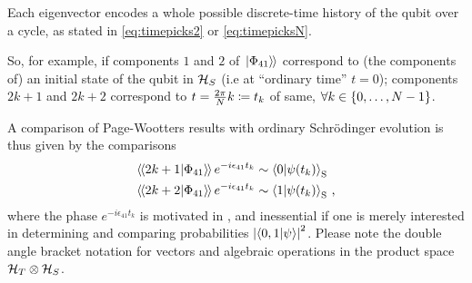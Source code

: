 Each eigenvector encodes a whole possible discrete-time history
of the qubit over a cycle,
as stated in \eqref{eq:timepicks2} or \eqref{eq:timepicksN}.

So, for example, if components $1$ and $2$ of $\left.\left| \Phi_{41} \right\rangle\hspace{-0.115em}\right\rangle$ correspond to
(the components of)
an initial state of the qubit in $\mathcal{H}_S$
(i.e at ``ordinary time'' $t=0$); components
$2k + 1$ and $2k + 2$ correspond to $t = \frac{2\pi}{N}k \coloneqq t_k$
of same, $\forall k \in \qty{0, \dots, N-1}$.

A comparison of Page-Wootters results with ordinary
Schr{\"o}dinger evolution is thus given by the comparisons
\begin{align}
  \left\langle\hspace{-0.115em}\left\langle 2k+1 \middle| \Phi_{41} \right\rangle\hspace{-0.115em}\right\rangle e^{-i \epsilon_{41} t_k} &\sim \braket{0}{\psi(t_k)}_{\mathrm{S}} \label{eq:comparison0} \\
  \left\langle\hspace{-0.115em}\left\langle 2k+2 \middle| \Phi_{41} \right\rangle\hspace{-0.115em}\right\rangle e^{-i \epsilon_{41} t_k} &\sim \braket{1}{\psi(t_k)}_{\mathrm{S}} \label{eq:comparison1}
  \,\text{,}
\end{align}
where the phase $e^{-i \epsilon_{41} t_k}$ is motivated in \cite[``The Zero-eigenvalue'']{Lloyd:Time},
and inessential if one is merely interested in determining and comparing probabilities
$\qty|\braket{0,1}{\psi}|^2$. Please note the double angle bracket notation for vectors
and algebraic operations in the product space $\mathcal{H}_T \otimes \mathcal{H}_S$.

